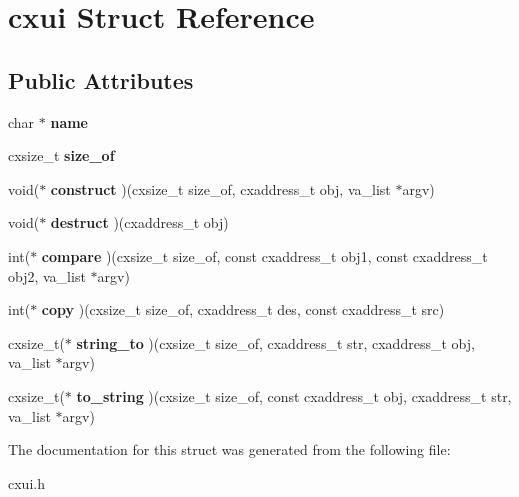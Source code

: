 \hypertarget{a00076}{}\section{cxui Struct Reference}
\label{a00076}
\subsection*{Public Attributes}
\begin{DoxyCompactItemize}
\item 
\mbox{\label{a00076_a9edf2234d6c5e377b374b7d6c950bbf5}} 
char $\ast$ {\bfseries name}
\item 
\mbox{\label{a00076_a51857dc6e083abb11aea3dfbd8cbcefe}} 
cxsize\+\_\+t {\bfseries size\+\_\+of}
\item 
\mbox{\label{a00076_a875809f41c644cb1541c1432ca937ee7}} 
void($\ast$ {\bfseries construct} )(cxsize\+\_\+t size\+\_\+of, cxaddress\+\_\+t obj, va\+\_\+list $\ast$argv)
\item 
\mbox{\label{a00076_a3d7dd83e42ba2a7d6a0aa49527162b90}} 
void($\ast$ {\bfseries destruct} )(cxaddress\+\_\+t obj)
\item 
\mbox{\label{a00076_a4c667e63ed3718837c8d72a61f08c5e7}} 
int($\ast$ {\bfseries compare} )(cxsize\+\_\+t size\+\_\+of, const cxaddress\+\_\+t obj1, const cxaddress\+\_\+t obj2, va\+\_\+list $\ast$argv)
\item 
\mbox{\label{a00076_abb0c082998801b196b4628c677d52355}} 
int($\ast$ {\bfseries copy} )(cxsize\+\_\+t size\+\_\+of, cxaddress\+\_\+t des, const cxaddress\+\_\+t src)
\item 
\mbox{\label{a00076_a0557283698a935aaa7975cfe7f988991}} 
cxsize\+\_\+t($\ast$ {\bfseries string\+\_\+to} )(cxsize\+\_\+t size\+\_\+of, cxaddress\+\_\+t str, cxaddress\+\_\+t obj, va\+\_\+list $\ast$argv)
\item 
\mbox{\label{a00076_a74e72113821a16a7c2e5d73c9a954d1e}} 
cxsize\+\_\+t($\ast$ {\bfseries to\+\_\+string} )(cxsize\+\_\+t size\+\_\+of, const cxaddress\+\_\+t obj, cxaddress\+\_\+t str, va\+\_\+list $\ast$argv)
\end{DoxyCompactItemize}


The documentation for this struct was generated from the following file\+:\begin{DoxyCompactItemize}
\item 
cxui.\+h\end{DoxyCompactItemize}
